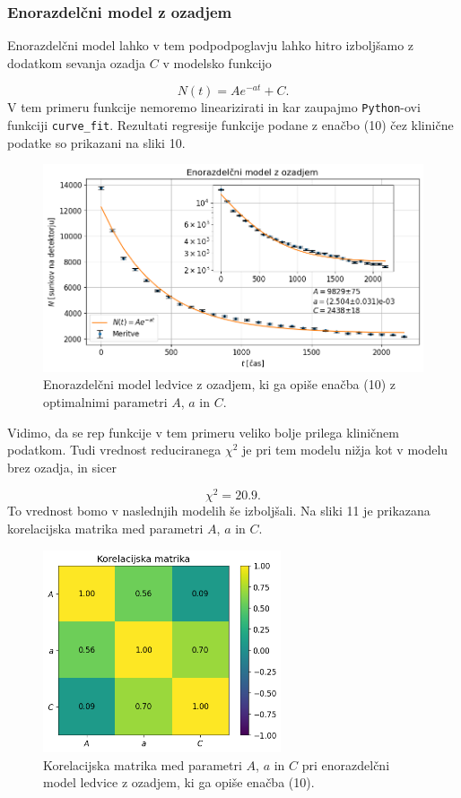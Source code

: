 \documentclass[slovene,11pt,a4paper]{article}
\begin{document}
\subsubsection{Enorazdelčni model z ozadjem}

Enorazdelčni model lahko v tem podpodpoglavju lahko hitro izboljšamo z dodatkom sevanja ozadja $C$ v modelsko funkcijo

\begin{equation}
N(t) = Ae^{-at} + C.
\end{equation}
V tem primeru funkcije nemoremo linearizirati in kar zaupajmo \texttt{Python}-ovi funkciji \texttt{curve\_fit}. Rezultati regresije funkcije podane z enačbo (10) čez klinične podatke so prikazani na sliki 10.

\begin{figure}[h!]
\centering
\includegraphics[width=13cm]{ledvice4.png}
\caption{Enorazdelčni model ledvice z ozadjem, ki ga opiše enačba (10) z optimalnimi parametri $A$, $a$ in $C$.}
\end{figure}
Vidimo, da se rep funkcije v tem primeru veliko bolje prilega kliničnem podatkom. Tudi vrednost reduciranega $\chi^2$ je pri tem modelu nižja kot v modelu brez ozadja, in sicer

\[
\chi^2 = 20.9.
\]
To vrednost bomo v naslednjih modelih še izboljšali. Na sliki 11 je prikazana korelacijska matrika med parametri $A$, $a$ in $C$.

\begin{figure}[h!]
\centering
\includegraphics[width=7cm]{ledvice5.png}
\caption{Korelacijska matrika med parametri $A$, $a$ in $C$ pri enorazdelčni model ledvice z ozadjem, ki ga opiše enačba (10).}
\end{figure}
\end{document}
